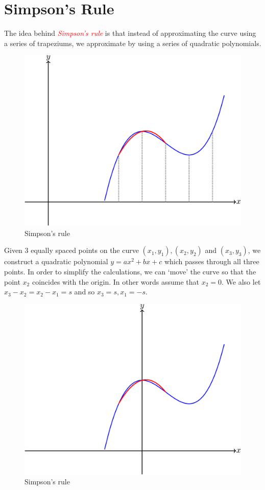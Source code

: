 \documentclass[
  11pt,
  oneside]{book}
\theoremstyle{definition}
\theoremstyle{definition}
\theoremstyle{definition}
\theoremstyle{definition}
\theoremstyle{remark}
\begin{document}
\section{Simpson's Rule}\label{simpsons-rule}

The idea behind \textcolor{red}{\em Simpson's rule} is that instead of approximating the curve using a series of trapeziums, we approximate by using a series of quadratic polynomials.

\begin{figure}

{\centering \includegraphics[width=0.4\linewidth]{tikztopng-figure29} 

}

\caption{Simpson's rule}\label{fig:unnamed-chunk-54}
\end{figure}

Given 3 equally spaced points on the curve \((x_1,y_1), (x_2, y_2)\) and \((x_3,y_3)\), we construct a quadratic polynomial \(y=ax^2+bx+c\) which passes through all three points. In order to simplify the calculations, we can `move' the curve so that the point \(x_2\) coincides with the origin. In other words assume that \(x_2=0\). We also let \(x_3-x_2=x_2-x_1=s\) and so \(x_3=s, x_1=-s\).

\begin{figure}

{\centering \includegraphics[width=0.4\linewidth]{tikztopng-figure30} 

}

\caption{Simpson's rule}\label{fig:unnamed-chunk-55}
\end{figure}
\end{document}
